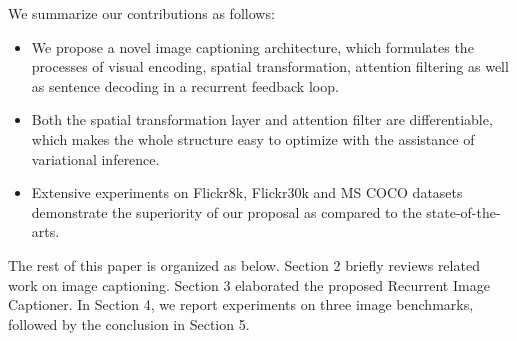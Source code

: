 \documentclass[10pt,twocolumn,letterpaper]{article}
\begin{document}
	We summarize our contributions as follows:
	\begin{itemize}
		\item We propose a novel image captioning architecture, which formulates the processes of visual encoding, spatial transformation, attention filtering as well as sentence decoding in a recurrent feedback loop.
		\item Both the spatial transformation layer and attention filter are differentiable, which makes the whole structure easy to optimize with the assistance of variational inference.
		\item Extensive experiments on Flickr8k, Flickr30k and MS COCO datasets demonstrate the superiority of our proposal as compared to the state-of-the-arts.
	\end{itemize}
	
	The rest of this paper is organized as below. Section 2 briefly reviews related work on image captioning. Section 3 elaborated the proposed Recurrent Image Captioner. In Section 4, we report experiments on three image benchmarks, followed by the conclusion in Section 5.
	
	
\end{document}
